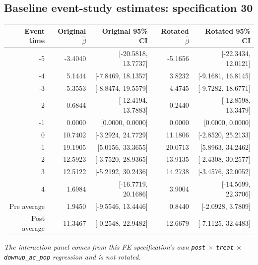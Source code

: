 \documentclass[10pt]{article}
\begin{document}
\subsection*{Baseline event-study estimates: specification 30}
\begin{center}
\scriptsize
\begin{tabular}{r rr rr}
\toprule
Event time & Original $\hat\beta$ & Original 95\% CI & Rotated $\hat\beta$ & Rotated 95\% CI \\
\midrule
-5 & -3.4040 & [-20.5818, 13.7737] & -5.1656 & [-22.3434, 12.0121] \\
-4 & 5.1444 & [-7.8469, 18.1357] & 3.8232 & [-9.1681, 16.8145] \\
-3 & 5.3553 & [-8.8474, 19.5579] & 4.4745 & [-9.7282, 18.6771] \\
-2 & 0.6844 & [-12.4194, 13.7883] & 0.2440 & [-12.8598, 13.3479] \\
-1 & 0.0000 & [0.0000, 0.0000] & 0.0000 & [0.0000, 0.0000] \\
0 & 10.7402 & [-3.2924, 24.7729] & 11.1806 & [-2.8520, 25.2133] \\
1 & 19.1905 & [5.0156, 33.3655] & 20.0713 & [5.8963, 34.2462] \\
2 & 12.5923 & [-3.7520, 28.9365] & 13.9135 & [-2.4308, 30.2577] \\
3 & 12.5122 & [-5.2192, 30.2436] & 14.2738 & [-3.4576, 32.0052] \\
4 & 1.6984 & [-16.7719, 20.1686] & 3.9004 & [-14.5699, 22.3706] \\
\midrule
Pre average & 1.9450 & [-9.5546, 13.4446] & 0.8440 & [-2.0928, 3.7809] \\
Post average & 11.3467 & [-0.2548, 22.9482] & 12.6679 & [-7.1125, 32.4483] \\
\bottomrule
\end{tabular}
\end{center}
\medskip
\textit{The interaction panel comes from this FE specification's own \texttt{post} $\times$ \texttt{treat} $\times$ \texttt{downup\_ac\_pop} regression and is not rotated.}
\clearpage
\end{document}
